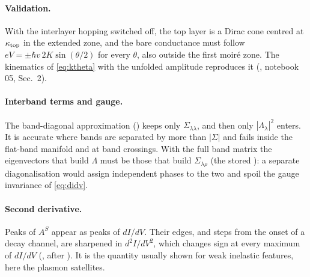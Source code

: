\paragraph{Validation.} With the interlayer hopping switched off, the top layer is a Dirac cone centred at
$\kappa_{\rm top}$ in the extended zone, and the bare conductance must follow $eV=\pm\hbar v\,2K\sin(\theta/2)$ for every
$\theta$, also outside the first moir\'e zone. The kinematics of \cref{eq:ktheta} with the unfolded amplitude
reproduces it (, notebook 05, Sec.~2).

\paragraph{Interband terms and gauge.} The band-diagonal approximation () keeps only
$\Sigma_{\lambda\lambda}$, and then only $|\Lambda_\lambda|^2$ enters. It is accurate where bands are separated by more than
$|\Sigma|$ and fails inside the flat-band manifold and at band crossings. With the full band matrix the eigenvectors
that build $\Lambda$ must be those that build $\Sigma_{\lambda\rho}$ (the stored ): a
separate diagonalisation would assign independent phases to the two and spoil the gauge invariance of
\cref{eq:didv}.

\paragraph{Second derivative.} Peaks of $A^S$ appear as peaks of $dI/dV$. Their edges, and steps from the onset of
a decay channel, are sharpened in $d^2I/dV^2$, which changes sign at every maximum of $dI/dV$
(, after ). It is the quantity usually shown for weak inelastic
features, here the plasmon satellites.
